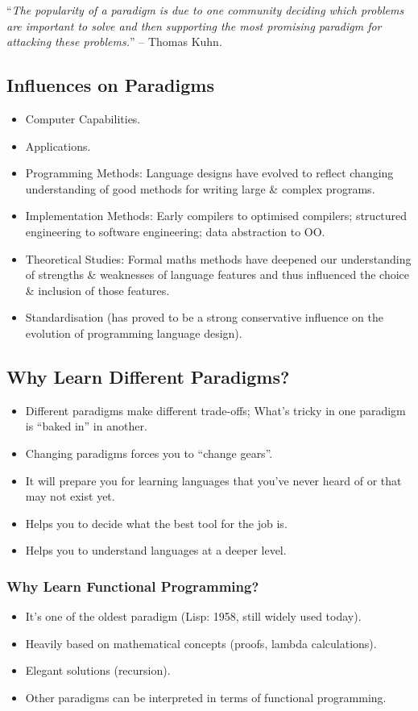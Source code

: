 \documentclass[a4paper,11pt]{article}
\begin{document}
``\textit{The popularity of a paradigm is due to one community deciding which problems are important to solve and then supporting the 
most promising paradigm for attacking these problems.}'' -- Thomas Kuhn.

\subsection{Influences on Paradigms}
\begin{itemize}
    \item   Computer Capabilities.
    \item   Applications. 
    \item   Programming Methods: Language designs have evolved to reflect changing understanding of good methods for writing 
            large \& complex programs. 
    \item   Implementation Methods: Early compilers to optimised compilers; structured engineering to software engineering; data 
            abstraction to OO.
    \item   Theoretical Studies: Formal maths methods have deepened our understanding of strengths \& weaknesses of language
            features and thus influenced the choice \& inclusion of those features. 
    \item   Standardisation (has proved to be a strong conservative influence on the evolution of programming language design).
\end{itemize}

\subsection{Why Learn Different Paradigms?}
\begin{itemize}
    \item   Different paradigms make different trade-offs; What's tricky in one paradigm is ``baked in''  in another.
    \item   Changing paradigms forces you to ``change gears''.
    \item   It will prepare you for learning languages that you've never heard of or that may not exist yet.
    \item   Helps you to decide what the best tool for the job is.
    \item   Helps you to understand languages at a deeper level.
\end{itemize}

\subsubsection{Why Learn Functional Programming?}
\begin{itemize}
    \item   It's one of the oldest paradigm (Lisp: 1958, still widely used today).
    \item   Heavily based on mathematical concepts (proofs, lambda calculations).
    \item   Elegant solutions (recursion).
    \item   Other paradigms can be interpreted in terms of functional programming.
\end{itemize}
\end{document}
